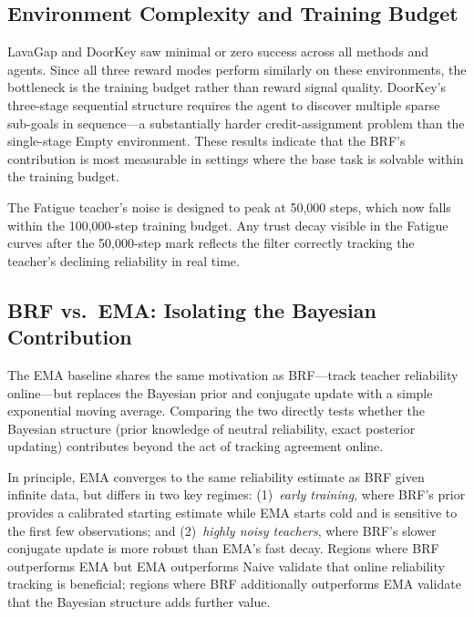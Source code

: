 \documentclass[11pt]{article}
\begin{document}
\subsection{Environment Complexity and Training Budget}
\label{sec:budget}

LavaGap and DoorKey saw minimal or zero success across all methods and agents.
Since all three reward modes perform similarly on these environments, the
bottleneck is the training budget rather than reward signal quality. DoorKey's
three-stage sequential structure requires the agent to discover multiple sparse
sub-goals in sequence---a substantially harder credit-assignment problem than
the single-stage Empty environment. These results indicate that the BRF's
contribution is most measurable in settings where the base task is solvable
within the training budget.

The Fatigue teacher's noise is designed to peak at 50{,}000 steps, which now
falls within the 100{,}000-step training budget. Any trust decay visible in
the Fatigue curves after the 50{,}000-step mark reflects the filter correctly
tracking the teacher's declining reliability in real time.

\subsection{BRF vs.\ EMA: Isolating the Bayesian Contribution}

The EMA baseline shares the same motivation as BRF---track teacher reliability
online---but replaces the Bayesian prior and conjugate update with a simple
exponential moving average. Comparing the two directly tests whether the
Bayesian structure (prior knowledge of neutral reliability, exact posterior
updating) contributes beyond the act of tracking agreement online.

In principle, EMA converges to the same reliability estimate as BRF given
infinite data, but differs in two key regimes: (1)~\emph{early training},
where BRF's prior provides a calibrated starting estimate while EMA starts
cold and is sensitive to the first few observations; and (2)~\emph{highly
noisy teachers}, where BRF's slower conjugate update is more robust than
EMA's fast decay. Regions where BRF outperforms EMA but EMA outperforms Naive
validate that online reliability tracking is beneficial; regions where BRF
additionally outperforms EMA validate that the Bayesian structure adds further
value.
\end{document}
